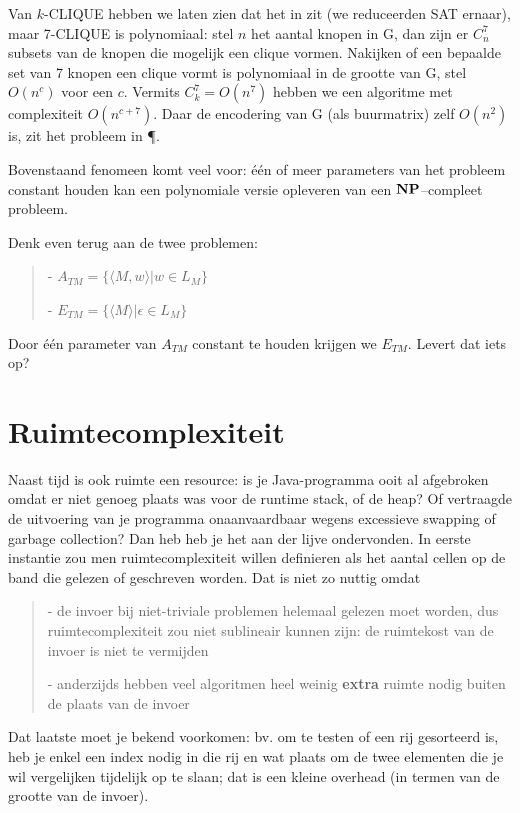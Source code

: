 Van $k$-CLIQUE hebben we laten zien dat het in \NPC zit (we reduceerden
SAT ernaar), maar 7-CLIQUE is polynomiaal: stel $n$ het aantal knopen in G,
dan zijn er $C_n^7$ subsets van de knopen die mogelijk een clique vormen.
Nakijken of een bepaalde set van 7 knopen een clique vormt is
polynomiaal in de grootte van G, stel $O(n^c)$ voor een $c$. Vermits
$C_k^7 = O(n^7)$ hebben we een algoritme met complexiteit
$O(n^{c+7})$. Daar de encodering van G (als buurmatrix) zelf $O(n^2)$
is, zit het probleem in \P.

Bovenstaand fenomeen komt veel voor: \'{e}\'{e}n of meer parameters
van het probleem constant houden kan een polynomiale versie opleveren
van een ${\bf NP}$--compleet probleem.

Denk even terug aan de twee problemen:

\begin{verse}
- $A_{TM} = \{\langle M,w \rangle| w \in L_M\}$

- $E_{TM} = \{\langle M \rangle| \epsilon \in L_M\}$
\end{verse}

Door \'{e}\'{e}n parameter van $A_{TM}$ constant te houden krijgen we
$E_{TM}$. Levert dat iets op?



\section{Ruimtecomplexiteit}

Naast tijd is ook ruimte een resource: is je
Java-programma ooit al afgebroken omdat er niet genoeg plaats was voor
de runtime stack, of de heap? Of vertraagde de uitvoering van je
programma onaanvaardbaar wegens excessieve swapping of garbage
collection? Dan heb heb je het aan der lijve ondervonden. In eerste
instantie zou men ruimtecomplexiteit willen definieren als het aantal
cellen op de band die gelezen of geschreven worden. Dat is niet zo
nuttig omdat
\begin{verse}
- de invoer bij niet-triviale problemen helemaal gelezen moet worden,
dus ruimtecomplexiteit zou niet sublineair kunnen zijn: de ruimtekost
van de invoer is niet te vermijden

- anderzijds hebben veel algoritmen heel weinig {\bf extra} ruimte
nodig buiten de plaats van de invoer
\end{verse}

Dat laatste moet je bekend voorkomen: bv. om te testen of een rij
gesorteerd is, heb je enkel een index nodig in die rij en wat plaats
om de twee elementen die je wil vergelijken tijdelijk op te slaan; dat
is een kleine overhead (in termen van de grootte van de invoer).

